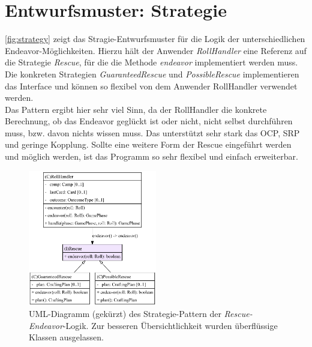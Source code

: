 \section{Entwurfsmuster: Strategie}

\autoref{fig:strategy} zeigt das Stragie-Entwurfsmuster für die Logik der unterschiedlichen Endeavor-Möglichkeiten. 
Hierzu hält der Anwender \textit{RollHandler} eine Referenz auf die Strategie \textit{Rescue}, für die die 
Methode \textit{endeavor} implementiert werden muss. Die konkreten Strategien \textit{GuaranteedRescue} und \textit{PossibleRescue}
implementieren das Interface und können so flexibel von dem Anwender RollHandler verwendet werden. \\ 
Das Pattern ergibt hier sehr viel Sinn, da der RollHandler die konkrete Berechnung, ob das Endeavor geglückt ist oder nicht, 
nicht selbst durchführen muss, bzw. davon nichts wissen muss. Das unterstützt sehr stark das OCP, SRP und geringe Kopplung. 
Sollte eine weitere Form der Rescue eingeführt werden und möglich werden, ist das Programm so sehr flexibel und einfach 
erweiterbar.  

\begin{figure}[H]
	\centering
	\includegraphics[width=0.5\textwidth]{Bilder/Rescue_structure.pdf} 
    \caption{UML-Diagramm (gekürzt) des Strategie-Pattern der \textit{Rescue-Endeavor}-Logik. Zur besseren Übersichtlichkeit 
    wurden überflüssige Klassen ausgelassen.}
	\label{fig:strategy}
\end{figure} 